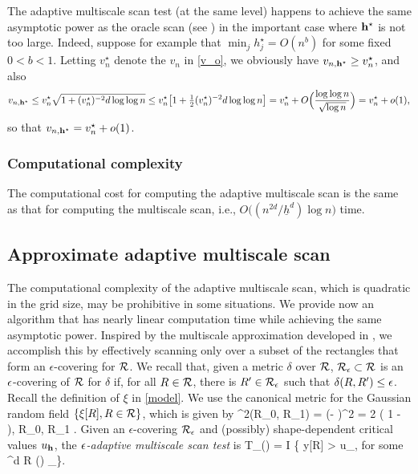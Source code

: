 \documentclass[twoside,11pt]{article}
\begin{document}
The adaptive multiscale scan test (at the same level) happens to achieve the same asymptotic power as the oracle scan (see ) in the important case where $\mathbf{h}^\star$ is not too large.  
Indeed, suppose for example that $\min_j h_j^\star = O(n^b)$ for some fixed $0 < b < 1$.  Letting $v_n^\star$ denote the $v_n$ in \eqref{v_o}, we obviously have $v_{n, \mathbf{h}^\star} \ge v_n^\star$, and also 
\[
v_{n, \mathbf{h}^\star} 
\le v_n^\star \sqrt{1 + (v_n^\star)^{-2} d \log \log n}
\le v_n^\star \big[1 + \tfrac12 (v_n^\star)^{-2} d \log \log n\big]
= v_n^\star + O\Big(\frac{\log\log n}{\sqrt{\log n}}\Big) 
= v_n^\star + o(1),
\]
so that $v_{n, \mathbf{h}^\star} = v_n^\star + o(1)$.  


\subsubsection{Computational complexity}
The computational cost for computing the adaptive multiscale scan is the same as that for computing the multiscale scan, i.e., $
O\big((n^{2d}/\underline h^d) \log n \big)$ time.




\subsection{Approximate adaptive multiscale scan}
\label{sec:eps-scan}

The computational complexity of the adaptive multiscale scan, which is quadratic in the grid size, may be prohibitive in some situations.  We provide now an algorithm that has nearly linear computation time while achieving the same asymptotic power.  
Inspired by the multiscale approximation developed in \citep{MGD,cluster,MR2604703}, we accomplish this by effectively scanning only over a subset of the rectangles that form an $\epsilon$-covering for $\mathcal{R}$.
We recall that, given a metric $\delta$ over $\mathcal{R}$, $\mathcal{R}_\epsilon \subset \mathcal{R}$ is an $\epsilon$-covering of $\mathcal{R}$ for $\delta$ if, for all $R \in \mathcal{R}$, there is $R' \in \mathcal{R}_\epsilon$ such that $\delta(R, R') \le \epsilon$.  
Recall the definition of $\xi$ in \eqref{model}.
We use the canonical metric for the Gaussian random field $\{\xi[R], R \in \mathcal{R}\}$, which is given by 
\beq \label{delta}
\delta^2(R_0, R_1) = \EE (\xi[R_0] - \xi[R_1])^2 = 2 \bigg( 1 -  \bigg), \quad \forall R_0, R_1 \in \Rcal.
\eeq
Given an $\epsilon$-covering $\mathcal{R}_\epsilon$ and (possibly) shape-dependent critical values $u_{\mathbf{h}}$, the {\em $\epsilon$-adaptive multiscale scan test} is  
\beq \label{scan_eps}
T_\eps(\yb) = I \big\{ y[R] > u_\hb, \textrm{ for some } \hb {}^d  R \in \Rcal(\hb) \cap \Rcal_\eps \big\}.
\eeq
\end{document}
